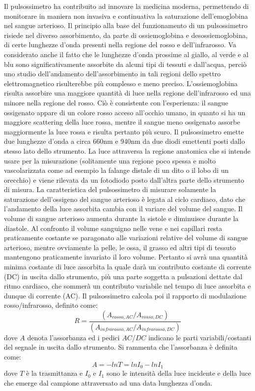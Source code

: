 \documentclass[a4paper, 12pt]{book}
\begin{document}
Il pulsossimetro ha contribuito ad innovare la medicina moderna, permettendo di monitorare in maniera non invasiva e continuativa la saturazione dell'emoglobina nel sangue arterioso.
Il principio alla base del funzionamento di un pulsossimetro risiede nel diverso assorbimento, da parte di ossiemoglobina e desossiemoglobina, di certe lunghezze d'onda presenti nella regione del rosso e dell'infrarosso.
Va considerato anche il fatto che le lunghezze d'onda prossime al giallo, al verde e al blu sono significativamente assorbite da alcuni tipi di tessuti e dall'acqua, perciò uno studio dell'andamento dell'assorbimento in tali regioni dello spettro elettromagnetico risulterebbe più complesso e meno preciso.
L'ossiemoglobina risulta assorbire una maggiore quantità di luce nella regione dell'infrarosso ed una minore nella regione del rosso.
Ciò è consistente con l'esperienza: il sangue ossigenato appare di un colore rosso acceso all'occhio umano, in quanto si ha un maggiore scattering della luce rossa, mentre il sangue meno ossigenato assorbe maggiormente la luce rossa e risulta pertanto più scuro.
Il pulsossimetro emette due lunghezze d'onda a circa 660nm e 940nm da due diodi emettenti posti dallo stesso lato dello strumento.
La luce attraversa la regione anatomica che si intende usare per la misurazione (solitamente una regione poco spessa e molto vascolarizzata come ad esempio la falange distale di un dito o il lobo di un orecchio) e viene rilevata da un fotodiodo posto dall'altra parte dello strumento di misura.
La caratteristica del pulsossimetro di misurare solamente la saturazione dell'ossigeno del sangue arterioso è legata al ciclo cardiaco, dato che l'andamento della luce assorbita cambia con il variare del volume del sangue.
Il volume di sangue arterioso aumenta durante la sistole e diminuisce durante la diastole.
Al confronto il volume sanguigno nelle vene e nei capillari resta praticamente costante se paragonato alle variazioni relative del volume di sangue arterioso, mentre ovviamente la pelle, le ossa, il grasso ed altri tipi di tessuto mantengono praticamente invariato il loro volume.
Pertanto si avrà una quantità minima costante di luce assorbita la quale darà un contributo costante di corrente (DC) in uscita dallo strumento, più una parte soggetta a pulsazioni dettate dal ritmo cardiaco, che sommerà un contributo variabile nel tempo di luce assorbita e dunque di corrente (AC).
Il pulsossimetro calcola poi il rapporto di modulazione rosso/infrarosso, definito come:
\begin{equation}
    \label{eq:R}
    R=\frac{(A_{rosso,AC}/A_{rosso,DC})}{(A_{infrarosso,AC}/A_{infrarosso,DC})}
\end{equation}
dove $A$ denota l'assorbanza ed i pedici $AC$/$DC$ indicano le parti variabili/costanti del segnale in uscita dallo strumento.
Si rammenta che l'assorbanza è definita come:
\begin{equation}
    \label{eq:Absorbance}
    A = -ln T = ln I_{0} - ln I_{1}
\end{equation}
dove $T$ è la trasmittanza e $I_{0}$ e $I_{1}$ sono le intensità della luce incidente e della luce che emerge dal campione attraversato ad una data lunghezza d'onda.
\newline
\end{document}
